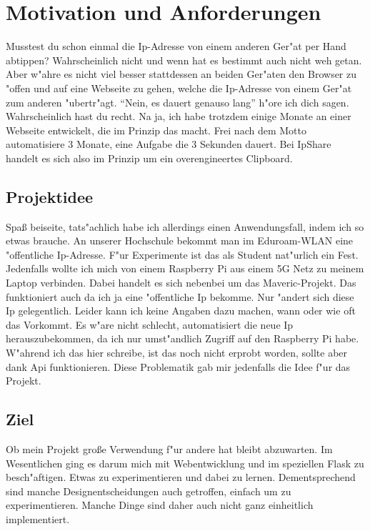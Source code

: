 
\chapter{Motivation und Anforderungen}\label{ch:motivation-und-anforderungen}
Musstest du schon einmal die Ip-Adresse von einem anderen Ger{"a}t per Hand abtippen?
Wahrscheinlich nicht und wenn hat es bestimmt auch nicht weh getan.
Aber w{"a}hre es nicht viel besser stattdessen an beiden Ger{"a}ten den Browser zu {"o}ffen und auf eine Webseite zu gehen,
welche die Ip-Adresse von einem Ger{"a}t zum anderen {"u}bertr{"a}gt.
``Nein, es dauert genauso lang'' h{"o}re ich dich sagen.
Wahrscheinlich hast du recht.
Na ja, ich habe trotzdem einige Monate an einer Webseite entwickelt, die im Prinzip das macht.
Frei nach dem Motto automatisiere 3 Monate, eine Aufgabe die 3 Sekunden dauert.
Bei IpShare handelt es sich also im Prinzip um ein overengineertes Clipboard.


\section{Projektidee}\label{sec:projektidee}
Spa{\ss} beiseite, tats{"a}chlich habe ich allerdings einen Anwendungsfall, indem ich so etwas brauche.
An unserer Hochschule bekommt man im Eduroam-WLAN eine {"o}ffentliche Ip-Adresse.
F{"u}r Experimente ist das als Student nat{"u}rlich ein Fest.
Jedenfalls wollte ich mich von einem Raspberry Pi aus einem 5G Netz zu meinem Laptop verbinden.
Dabei handelt es sich nebenbei um das Maveric-Projekt.
Das funktioniert auch da ich ja eine {"o}ffentliche Ip bekomme.
Nur {"a}ndert sich diese Ip gelegentlich.
Leider kann ich keine Angaben dazu machen, wann oder wie oft das Vorkommt.
Es w{"a}re nicht schlecht, automatisiert die neue Ip herauszubekommen, da ich nur umst{"a}ndlich Zugriff auf den Raspberry Pi habe.
W{"a}hrend ich das hier schreibe, ist das noch nicht erprobt worden, sollte aber dank Api funktionieren.
Diese Problematik gab mir jedenfalls die Idee f{"u}r das Projekt.

\section{Ziel}\label{sec:ziel}
Ob mein Projekt gro{\ss}e Verwendung f{"u}r andere hat bleibt abzuwarten.
Im Wesentlichen ging es darum mich mit Webentwicklung und im speziellen Flask zu besch{"a}ftigen.
Etwas zu experimentieren und dabei zu lernen.
Dementsprechend sind manche Designentscheidungen auch getroffen, einfach um zu experimentieren.
Manche Dinge sind daher auch nicht ganz einheitlich implementiert.

